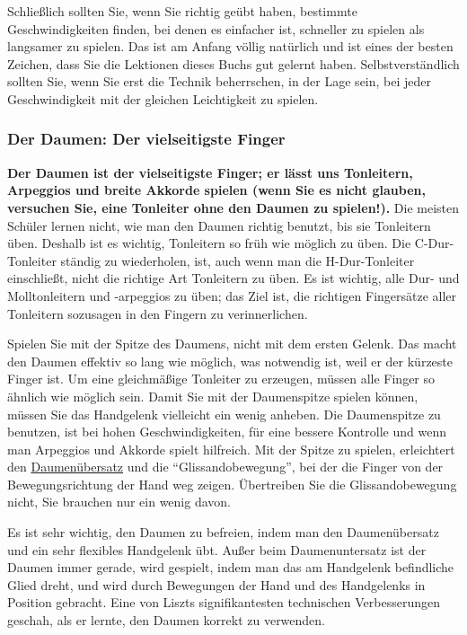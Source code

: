 Schließlich sollten Sie, wenn Sie richtig geübt haben, bestimmte Geschwindigkeiten finden, bei denen es einfacher ist, schneller zu spielen als langsamer zu spielen.
Das ist am Anfang völlig natürlich und ist eines der besten Zeichen, dass Sie die Lektionen dieses Buchs gut gelernt haben.
Selbstverständlich sollten Sie, wenn Sie erst die Technik beherrschen, in der Lage sein, bei jeder Geschwindigkeit mit der gleichen Leichtigkeit zu spielen.
 

\label{c1iii5g}
\subsubsection{Der Daumen: Der vielseitigste Finger}
\label{Daumen}
\textbf{Der Daumen ist der vielseitigste Finger; er lässt uns Tonleitern, Arpeggios und breite Akkorde spielen (wenn Sie es nicht glauben, versuchen Sie, eine Tonleiter ohne den Daumen zu spielen!).}
Die meisten Schüler lernen nicht, wie man den Daumen richtig benutzt, bis sie Tonleitern üben.
Deshalb ist es wichtig, Tonleitern so früh wie möglich zu üben.
Die C-Dur-Tonleiter ständig zu wiederholen, ist, auch wenn man die H-Dur-Tonleiter einschließt, nicht die richtige Art Tonleitern zu üben.
Es ist wichtig, alle Dur- und Molltonleitern und -arpeggios zu üben; das Ziel ist, die richtigen Fingersätze aller Tonleitern sozusagen in den Fingern zu verinnerlichen. 

Spielen Sie mit der Spitze des Daumens, nicht mit dem ersten Gelenk.
Das macht den Daumen effektiv so lang wie möglich, was notwendig ist, weil er der kürzeste Finger ist.
Um eine gleichmäßige Tonleiter zu erzeugen, müssen alle Finger so ähnlich wie möglich sein.
Damit Sie mit der Daumenspitze spielen können, müssen Sie das Handgelenk vielleicht ein wenig anheben.
Die Daumenspitze zu benutzen, ist bei hohen Geschwindigkeiten, für eine bessere Kontrolle und wenn man Arpeggios und Akkorde spielt hilfreich.
Mit der Spitze zu spielen, erleichtert den \hyperref[c1iii5b]{Daumenübersatz} und die \enquote{Glissandobewegung}, bei der die Finger von der Bewegungsrichtung der Hand weg zeigen.
Übertreiben Sie die Glissandobewegung nicht, Sie brauchen nur ein wenig davon.

Es ist sehr wichtig, den Daumen zu befreien, indem man den Daumenübersatz und ein sehr flexibles Handgelenk übt.
Außer beim Daumenuntersatz ist der Daumen immer gerade, wird gespielt, indem man das am Handgelenk befindliche Glied dreht, und wird durch Bewegungen der Hand und des Handgelenks in Position gebracht.
Eine von Liszts signifikantesten technischen Verbesserungen geschah, als er lernte, den Daumen korrekt zu verwenden.

